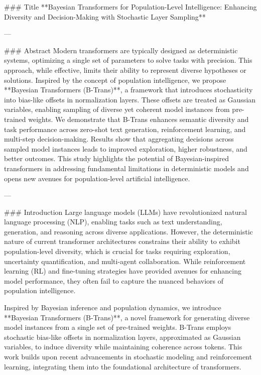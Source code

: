 ### Title  
**Bayesian Transformers for Population-Level Intelligence: Enhancing Diversity and Decision-Making with Stochastic Layer Sampling**

---

### Abstract  
Modern transformers are typically designed as deterministic systems, optimizing a single set of parameters to solve tasks with precision. This approach, while effective, limits their ability to represent diverse hypotheses or solutions. Inspired by the concept of population intelligence, we propose **Bayesian Transformers (B-Trans)**, a framework that introduces stochasticity into bias-like offsets in normalization layers. These offsets are treated as Gaussian variables, enabling sampling of diverse yet coherent model instances from pre-trained weights. We demonstrate that B-Trans enhances semantic diversity and task performance across zero-shot text generation, reinforcement learning, and multi-step decision-making. Results show that aggregating decisions across sampled model instances leads to improved exploration, higher robustness, and better outcomes. This study highlights the potential of Bayesian-inspired transformers in addressing fundamental limitations in deterministic models and opens new avenues for population-level artificial intelligence.

---

### Introduction  
Large language models (LLMs) have revolutionized natural language processing (NLP), enabling tasks such as text understanding, generation, and reasoning across diverse applications. However, the deterministic nature of current transformer architectures constrains their ability to exhibit population-level diversity, which is crucial for tasks requiring exploration, uncertainty quantification, and multi-agent collaboration. While reinforcement learning (RL) and fine-tuning strategies have provided avenues for enhancing model performance, they often fail to capture the nuanced behaviors of population intelligence.

Inspired by Bayesian inference and population dynamics, we introduce **Bayesian Transformers (B-Trans)**, a novel framework for generating diverse model instances from a single set of pre-trained weights. B-Trans employs stochastic bias-like offsets in normalization layers, approximated as Gaussian variables, to induce diversity while maintaining coherence across tokens. This work builds upon recent advancements in stochastic modeling and reinforcement learning, integrating them into the foundational architecture of transformers.

